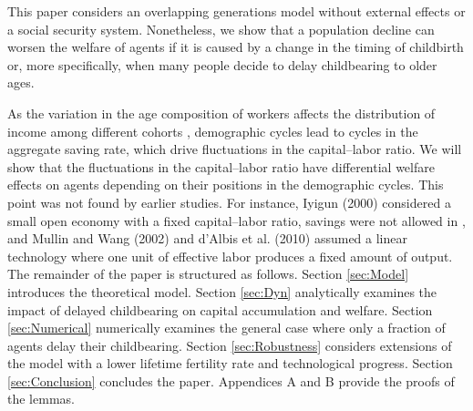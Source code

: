 \documentclass[nogrid]{MBE}%
\begin{document}
{This paper considers an overlapping generations model without external effects
or a social security system. Nonetheless, we show that a population decline
can worsen the welfare of agents if it is caused by a change in the timing of
childbirth or, more specifically, when many people decide to delay
childbearing to older ages.


 As the variation in the age composition of workers affects
the distribution of income among different cohorts \citep{Posada_Crandall:1998}, demographic
cycles lead to cycles in the aggregate saving rate, which drive fluctuations in the capital--labor
ratio. We will show that the fluctuations in the capital--labor ratio have differential welfare
effects on agents depending on their positions in the demographic cycles. This point was not found
by earlier studies. For instance, Iyigun (2000) considered a small open economy with a fixed
capital--labor ratio, savings were not allowed in \citep{Posada_Crandall:1998}, and Mullin and
Wang (2002) and d'Albis et al. (2010) assumed a linear technology where one unit of effective
labor produces a fixed amount of output. The remainder of the paper is structured as follows.
Section \ref{sec:Model} introduces the theoretical model. Section \ref{sec:Dyn} analytically
examines the impact of delayed childbearing on capital accumulation and welfare. Section
\ref{sec:Numerical} numerically examines the general case where only a fraction of agents delay
their childbearing. Section \ref{sec:Robustness} considers extensions of the model with a lower
lifetime fertility rate and technological progress. Section \ref{sec:Conclusion} concludes the
paper. Appendices A and B provide the proofs of the lemmas.

}
\end{document}
